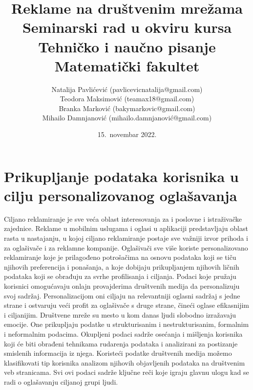 \documentclass[a4paper]{article}
\title{Reklame na društvenim mrežama\\ \small{Seminarski rad u okviru kursa\\Tehničko i naučno pisanje\\ Matematički fakultet}}
\author{Natalija Pavlićević (pavlicevicnatalija@gmail.com)\\ Teodora Maksimović (teamax18@gmail.com)\\ Branka Marković (bakymarkovic@gmail.com)\\ Mihailo Damnjanović (mihailo.damnjanović@gmail.com)}
\date{15.~novembar 2022.}
\begin{document}
	
	
	\tableofcontents
	
	\newpage
	
	
	\section{Prikupljanje podataka korisnika u cilju personalizovanog oglašavanja}
	\label{sec:podaci}
	Ciljano reklamiranje je sve veća oblast interesovanja za i poslovne i istraživačke zajednice. Reklame u mobilnim uslugama i oglasi u aplikaciji predstavljaju oblast rasta u nastajanju, u kojoj ciljano reklamiranje postaje sve važniji izvor prihoda i za oglašivače i za reklamne kompanije. Oglašivači sve više koriste personalizovano reklamiranje koje je prilagođeno potrošačima na osnovu podataka koji se tiču njihovih preferencija i ponašanja, a koje dobijaju prikupljanjem njihovih ličnih podataka koji se obrađuju za svrhe profilisanja i ciljanja. Podaci koje pružaju korisnici omogućavaju onlajn provajderima društvenih medija da personalizuju svoj sadržaj. Personalizacijom oni ciljaju na relevantniji oglasni sadržaj s jedne strane i ostvaruju veći profit za oglašivače s druge strane, čineći oglase efikasnijim i ciljanijim.
	Društvene mreže su mesto u kom danas ljudi slobodno izražavaju emocije. One prikupljaju podatke u strukturisanim i nestrukturisanim, formalnim i neformalnim podacima. Okupljeni podaci sadrže osećanja i mišljenja korisnika koji će biti obrađeni tehnikama rudarenja podataka i analizirani za postizanje smislenih informacija iz njega. Koristeći podatke društvenih medija možemo klasifikovati tip korisnika analizom njihovih objavljenih podataka na društvenim veb stranicama. Svi ovi podaci sadrže ključne reči koje igraju glavnu ulogu kad se radi o oglašavanju ciljanoj grupi ljudi.
	
\end{document}

